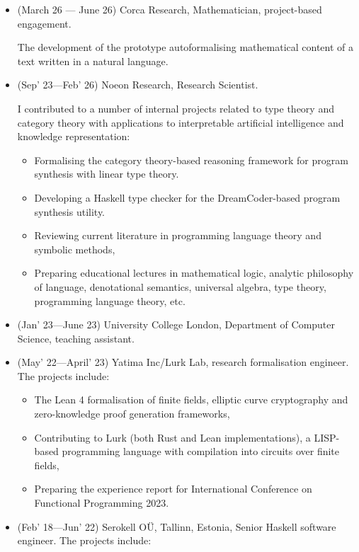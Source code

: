\documentclass[10pt,a4paper]{article}
\begin{document}
\begin{itemize}[leftmargin=*]
    \item (March 26 --- June 26) Corca Research, Mathematician, project-based engagement.

     The development of the prototype autoformalising mathematical content of a text written in a natural language.
    \item (Sep' 23---Feb' 26) Noeon Research, Research Scientist.

    I contributed to a number of internal projects related to type theory and category theory with applications to interpretable
    artificial intelligence and knowledge representation:
\begin{itemize}
    \item Formalising the category theory-based reasoning framework for program synthesis with linear type theory.
    \item Developing a Haskell type checker for the DreamCoder-based program synthesis utility.
    \item Reviewing current literature in programming language theory and symbolic methods,
    \item Preparing educational lectures in mathematical logic, analytic philosophy of language, denotational semantics, universal algebra, type theory, programming language theory, etc.
\end{itemize}
    \item (Jan' 23---June 23) University College London, Department of Computer Science, teaching assistant.
    \item (May' 22---April' 23) Yatima Inc/Lurk Lab, research formalisation engineer. The projects include:
    \begin{itemize}
    \item The Lean 4 formalisation of finite fields, elliptic curve cryptography and zero-knowledge proof generation frameworks,
    \item Contributing to Lurk (both Rust and Lean implementations), a LISP-based programming language with compilation into circuits over finite fields,
    \item Preparing the experience report for International Conference on Functional Programming 2023.
    \end{itemize}
    \item (Feb' 18---Jun' 22) Serokell OÜ, Tallinn, Estonia, Senior Haskell software engineer. The projects include:
    \begin{itemize}[leftmargin=*]

\end{itemize}
\end{itemize}
\end{document}
